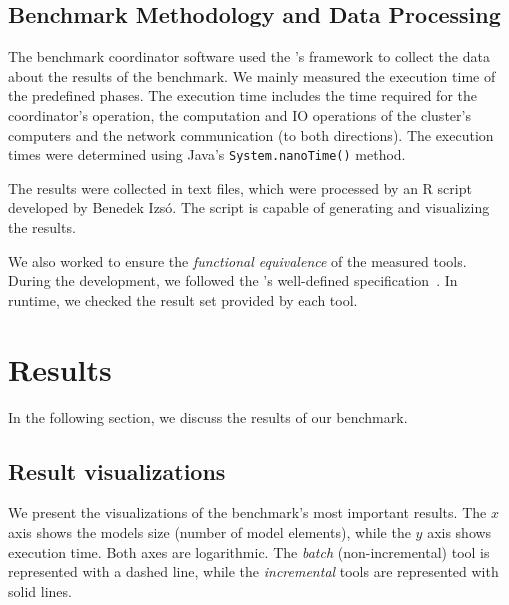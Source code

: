\subsection{Benchmark Methodology and Data Processing}
\label{benchmark-methodology}

The benchmark coordinator software used the \tb{}'s framework to collect the data about the results of the benchmark. We mainly measured the execution time of the predefined phases. The execution time includes the time required for the coordinator's operation, the computation and IO operations of the cluster's computers and the network communication (to both directions). The execution times were determined using Java's \texttt{System.nanoTime()} method.

The results were collected in text files, which were processed by an R script \cite{RProject} developed by Benedek Izsó. The script is capable of generating and visualizing the results. 

We also worked to ensure the \emph{functional equivalence} of the measured tools. During the development, we followed the \tb{}'s well-defined specification~\cite{ASE2013}. In runtime, we checked the result set provided by each tool.


\section{Results}
\label{evaluation-results}

In the following section, we discuss the results of our benchmark.

\subsection{Result visualizations}


We present the visualizations of the benchmark's most important results. The $x$ axis shows the models size (number of model elements), while the $y$ axis shows execution time. Both axes are logarithmic. The \emph{batch} (non-incremental) tool is represented with a dashed line, while the \emph{incremental} tools are represented with solid lines.

